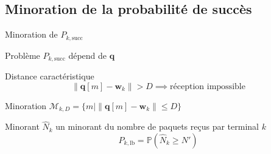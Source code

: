 \subsection{Minoration de la probabilité de succès}
\begin{frame}{Minoration de \( P_{k, \text{succ}} \)}
  \begin{alertblock}{Problème}
    \( P_{k, \text{succ}} \) dépend de \( \mathbf{q} \)
  \end{alertblock}
  \begin{block}{Distance caractéristique}
    \[ \| \mathbf{q}[m] - \mathbf{w}_{k} \| > D \implies
      \text{réception impossible} \]
  \end{block}
\end{frame}
\begin{frame}{Minoration}
  \( \mathcal{M}_{k, D} = \{ m | \| \mathbf{q}[m] - \mathbf{w}_k \|
  \leq D \} \)
  \begin{block}{Minorant}
    \( \hat{N}_k \) un minorant du nombre de paquets reçus par
    terminal \( k \)
    \begin{equation}
      P_{k, \text{lb}} = \mathbb{P}(\hat{N}_k \geq N')
    \end{equation}
  \end{block}
\end{frame}

